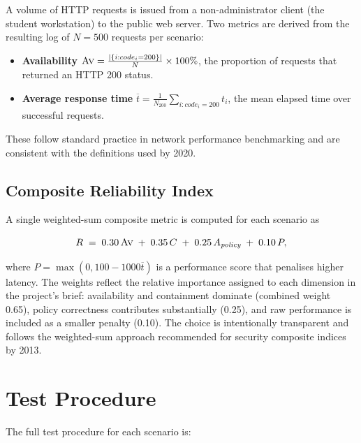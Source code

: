A volume of HTTP requests is issued from a non-administrator client (the student workstation) to the public web server. Two metrics are derived from the resulting log of $N = 500$ requests per scenario:

\begin{itemize}[leftmargin=*]
    \item \textbf{Availability} $\textsc{Av} = \frac{|\{i : code_i = 200\}|}{N} \times 100\%$, the proportion of requests that returned an HTTP 200 status.
    \item \textbf{Average response time} $\overline{t} = \frac{1}{N_{200}}\sum_{i: code_i=200} t_i$, the mean elapsed time over successful requests.
\end{itemize}

These follow standard practice in network performance benchmarking and are consistent with the definitions used by \textcite{Stallings}{2020}.

\subsection{Composite Reliability Index}

A single weighted-sum composite metric is computed for each scenario as

\begin{equation}
R \;=\; 0.30\,\textsc{Av} \;+\; 0.35\,C \;+\; 0.25\,A_{\textit{policy}} \;+\; 0.10\,P,
\label{eq:reliability}
\end{equation}

where $P = \max(0, 100 - 1000\overline{t})$ is a performance score that penalises higher latency. The weights reflect the relative importance assigned to each dimension in the project's brief: availability and containment dominate (combined weight 0.65), policy correctness contributes substantially (0.25), and raw performance is included as a smaller penalty (0.10). The choice is intentionally transparent and follows the weighted-sum approach recommended for security composite indices by \textcite{Cherdantseva and Hilton}{2013}.

\section{Test Procedure}

The full test procedure for each scenario is:


